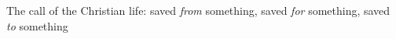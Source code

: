 \newcommand{\Date}{March 1, 2020}
\newcommand{\Title}{Teaching: 1 Peter 2:13--25}



\begin{enumerate}
    The call of the Christian life: saved \textit{from} something, saved
        \textit{for} something, saved \textit{to} something
\end{enumerate}


